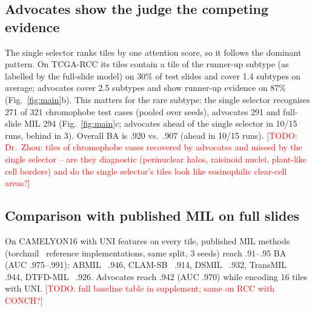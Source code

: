 \documentclass[runningheads]{llncs}
\newcommand{\todo}[1]{\textcolor{red}{[TODO: #1]}}
\begin{document}
\subsection{Advocates show the judge the competing evidence}
The single selector ranks tiles by one attention score, so it follows the dominant pattern. On TCGA-RCC its tiles contain a tile of the runner-up subtype (as labelled by the full-slide model) on 30\% of test slides and cover 1.4 subtypes on average; advocates cover 2.5 subtypes and show runner-up evidence on 87\% (Fig.~\ref{fig:main}b). This matters for the rare subtype: the single selector recognises 271 of 321 chromophobe test cases (pooled over seeds), advocates 291 and full-slide MIL 294 (Fig.~\ref{fig:main}c; advocates ahead of the single selector in 10/15 runs, behind in 3). Overall BA is .920 vs.\ .907 (ahead in 10/15 runs). \todo{Dr.\ Zhou: tiles of chromophobe cases recovered by advocates and missed by the single selector -- are they diagnostic (perinuclear halos, raisinoid nuclei, plant-like cell borders) and do the single selector's tiles look like eosinophilic clear-cell areas?}

\subsection{Comparison with published MIL on full slides}
On CAMELYON16 with UNI features on every tile, published MIL methods (torchmil~\cite{torchmil} reference implementations, same split, 3 seeds) reach .91--.95 BA (AUC .975--.991): ABMIL~\cite{ilse2018abmil} .946, CLAM-SB~\cite{lu2021data} .914, DSMIL~\cite{li2021dual} .932, TransMIL~\cite{shao2021transmil} .944, DTFD-MIL~\cite{zhang2022dtfd} .926. Advocates reach .942 (AUC .970) while encoding 16 tiles with UNI. \todo{full baseline table in supplement; same on RCC with CONCH?}
\end{document}
